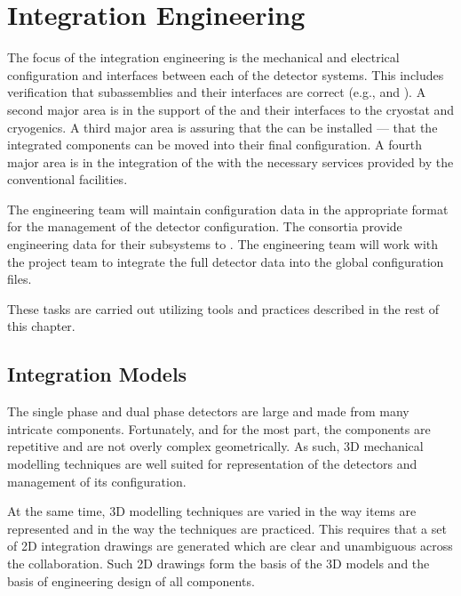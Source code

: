 \chapter{Integration Engineering}
\label{sec:fdsp-coord-integ-sysengr}

The focus of the integration engineering is the mechanical and
electrical configuration and interfaces between each of the detector
systems. This includes verification that subassemblies and their
interfaces are correct (e.g.,  and \single {}). A
second major area is in the support of the  and
their interfaces to the cryostat and cryogenics. A third major area is
assuring that the  can be installed --- that the
integrated components can be moved into their final configuration. A
fourth major area is in the integration of the  with
the necessary services provided by the conventional facilities.


The  engineering team will maintain configuration data in
the appropriate format for the management of the detector
configuration. The consortia provide engineering data for their
subsystems to . The  engineering team will work
with the  project team to integrate the full detector data
into the global  configuration files.

These tasks are carried out utilizing tools and practices
described in the rest of this chapter.

\section{Integration Models}
\label{sec:fdsp-coord-integ-models}
The single phase and dual phase detectors are large and made from many
intricate components. Fortunately, and for the most part, the
components are repetitive and are not overly complex geometrically. As
such, 3D mechanical modelling techniques are well suited for
representation of the detectors and management of its configuration.


At the same time, 3D modelling techniques are varied in the way items
are represented and in the way the techniques are practiced. This
requires that a set of 2D integration drawings are generated which are
clear and unambiguous across the collaboration. Such 2D drawings form
the basis of the 3D models and the basis of engineering design of all
components.


